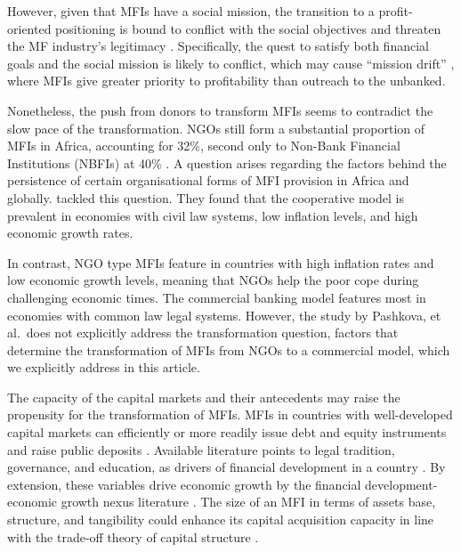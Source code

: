 \documentclass[a4paper,nobind]{templates/ociamthesis}
\begin{document}
However, given that MFIs have a social mission, the transition to a profit-oriented positioning is bound to conflict with the social objectives and threaten the MF industry's legitimacy \autocite{ramus2017,nason2018behavioral}. Specifically, the quest to satisfy both financial goals and the social mission is likely to conflict, which may cause ``mission drift'' \autocite{mersland2010microfinance,mia2017mission}, where MFIs give greater priority to profitability than outreach to the unbanked.

Nonetheless, the push from donors to transform MFIs seems to contradict the slow pace of the transformation. NGOs still form a substantial proportion of MFIs in Africa, accounting for 32\%, second only to Non-Bank Financial Institutions (NBFIs) at 40\% \autocite{market2018global}. A question arises regarding the factors behind the persistence of certain organisational forms of MFI provision in Africa and globally. \textcite{pashkova2016business} tackled this question. They found that the cooperative model is prevalent in economies with civil law systems, low inflation levels, and high economic growth rates.

In contrast, NGO type MFIs feature in countries with high inflation rates and low economic growth levels, meaning that NGOs help the poor cope during challenging economic times. The commercial banking model features most in economies with common law legal systems. However, the study by Pashkova, et al.~does not explicitly address the transformation question, factors that determine the transformation of MFIs from NGOs to a commercial model, which we explicitly address in this article.

The capacity of the capital markets and their antecedents may raise the propensity for the transformation of MFIs. MFIs in countries with well-developed capital markets can efficiently or more readily issue debt and equity instruments and raise public deposits \autocite{allen2013resolving,allen2014african}. Available literature points to legal tradition, governance, and education, as drivers of financial development in a country \autocite{rajan1998financial,baltagi2009financial}. By extension, these variables drive economic growth by the financial development-economic growth nexus literature \autocite{claessens2003financial}. The size of an MFI in terms of assets base, structure, and tangibility could enhance its capital acquisition capacity in line with the trade-off theory of capital structure \autocite{barclay2005capital,gwatidzo2009corporate,ojah2016effects}.
\end{document}

